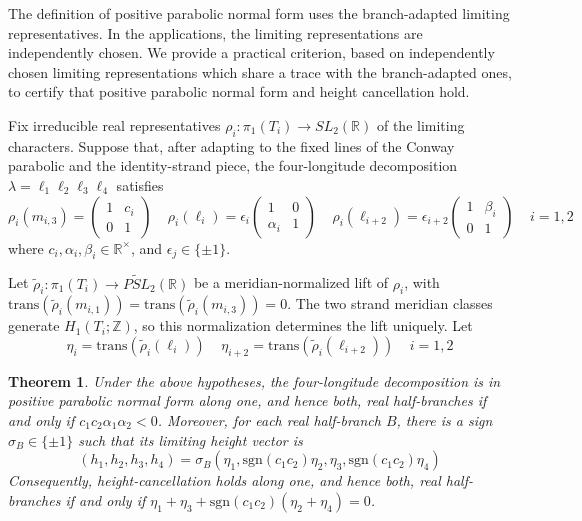 \documentclass{article}
\theoremstyle{plain}
\newtheorem{theorem}{Theorem}[section]
\theoremstyle{definition}
\theoremstyle{plain}
\theoremstyle{plain}
\theoremstyle{plain}
\theoremstyle{remark}
\theoremstyle{remark}
\theoremstyle{plain}
\theoremstyle{plain}
\theoremstyle{plain}
\theoremstyle{plain}
\begin{document}
The definition of positive parabolic normal form uses the branch-adapted limiting representatives. In the applications, the limiting representations are independently chosen. We provide a practical criterion, based on independently chosen limiting representations which share a trace with the branch-adapted ones, to certify that positive parabolic normal form and height cancellation hold. 

\medskip

Fix irreducible real representatives $\rho_i: \pi_1(T_i) \to SL_2(\mathbb R)$ of the limiting characters. Suppose that, after adapting to the fixed lines of the Conway parabolic and the identity-strand piece, the four-longitude decomposition $\lambda = \ell_1\ell_2\ell_3\ell_4$ satisfies
\begin{equation*}
	\rho_i(m_{i, 3}) = \begin{pmatrix}1 & c_i\\0&1\end{pmatrix} \ \ \ \ \ \rho_i(\ell_i)=\epsilon_i\begin{pmatrix}1 & 0 \\ \alpha_i & 1\end{pmatrix} \ \ \ \ \ \rho_i(\ell_{i+2}) = \epsilon_{i+2}\begin{pmatrix}1&\beta_i\\0&1\end{pmatrix} \ \ \ \ \ i = 1, 2
\end{equation*}
where $c_i, \alpha_i, \beta_i \in \mathbb R^\times$, and $\epsilon_j \in \{\pm 1\}$. 

\medskip

Let $\widetilde\rho_i: \pi_1(T_i) \to \widetilde{PSL}_2(\mathbb R)$ be a meridian-normalized lift of $\rho_i$, with $\mathrm{trans}(\widetilde\rho_i(m_{i,1})) = \mathrm{trans}(\widetilde\rho_i(m_{i,3})) = 0$. The two strand meridian classes generate $H_1(T_i; \mathbb{Z})$, so this normalization determines the lift uniquely. Let 
\begin{equation*}
	\eta_i = \mathrm{trans}(\widetilde\rho_i(\ell_i)) \ \ \ \ \ \eta_{i+2} = \mathrm{trans}(\widetilde\rho_i(\ell_{i+2})) \ \ \ \ \ i = 1, 2
\end{equation*}

\begin{theorem}\label{thm:modelcriterion}
Under the above hypotheses, the four-longitude decomposition is in positive parabolic normal form along one, and hence both, real half-branches if and only if $c_1c_2\alpha_1\alpha_2 < 0$. Moreover, for each real half-branch $B$, there is a sign $\sigma_B \in \{\pm 1\}$ such that its limiting height vector is 
\begin{equation*}
	(h_1, h_2, h_3, h_4) = \sigma_B(\eta_1, \mathrm{sgn}(c_1c_2)\eta_2, \eta_3, \mathrm{sgn}(c_1c_2)\eta_4)
\end{equation*}
Consequently, height-cancellation holds along one, and hence both, real half-branches if and only if $\eta_1+\eta_3 + \mathrm{sgn}(c_1c_2)(\eta_2 + \eta_4) = 0$. 
\end{theorem}
\end{document}
